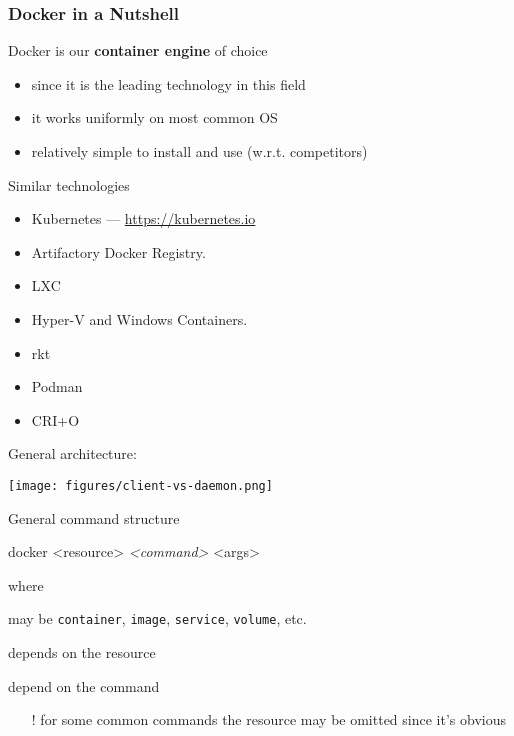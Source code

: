 \documentclass[presentation]{beamer}\mode<presentation>{\usetheme{AMSBolognaFC}}
\begin{document}
\begin{frame}[allowframebreaks]
\frametitle{Docker in a Nutshell}

    \begin{block}{Docker is our \textbf{container engine} of choice}
        \begin{itemize}
            \item since it is the leading technology in this field
            \item it works uniformly on most common OS
            \item relatively simple to install and use (w.r.t. competitors)
        \end{itemize}
    \end{block}

    \begin{block}{Similar technologies}
        \begin{itemize}
            \item Kubernetes --- \url{https://kubernetes.io}
            \item Artifactory Docker Registry.
            \item LXC
            \item Hyper-V and Windows Containers.
            \item rkt
            \item Podman
            \item CRI+O
        \end{itemize}
    \end{block}
    \framebreak
    General architecture:
    \begin{center}
        \texttt{[image: figures/client-vs-daemon.png]}
    \end{center}

    \framebreak

    \begin{block}{General command structure}
        \centering\ttfamily

        docker \alert{<resource>} \textit{<command>} <args>
    \end{block}
    where
    \begin{description}\small
        \item[\texttt{resource}] may be \texttt{container}, \texttt{image}, \texttt{service}, \texttt{volume}, etc.
        \item[\texttt{command}] depends on the resource
        \item[\texttt{args}] depend on the command
    \end{description}
    \begin{itemize}\small
        \item[!] for some common commands the resource may be omitted since it's obvious
    \end{itemize}


\end{frame}
\end{document}
